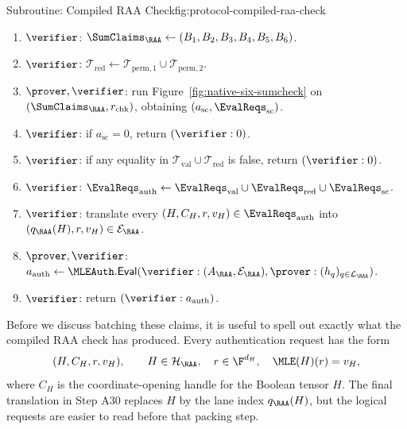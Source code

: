 \begin{protocolbox}{Subroutine: Compiled RAA Check}{fig:protocol-compiled-raa-check}
\begin{enumerate}[leftmargin=0.24in,label=\textbf{A\arabic*.},itemsep=0.06em,topsep=0.06em,parsep=0pt]
  \item \(\verifier\): \(\SumClaims_{\RAA}\gets(B_1,B_2,B_3,B_4,B_5,B_6)\).
  \item \(\verifier\): \(\mathcal T_{\mathrm{red}}\gets
        \mathcal T_{\mathrm{perm},1}\cup\mathcal T_{\mathrm{perm},2}\).
  \item \(\prover,\verifier\): run Figure~\ref{fig:native-six-sumcheck} on
        \((\SumClaims_{\RAA},r_{\mathrm{chk}})\), obtaining
        \((a_{\mathrm{sc}},\EvalReqs_{\mathrm{sc}})\).
  \item \(\verifier\): if \(a_{\mathrm{sc}}=0\), return \((\verifier:0)\).
  \item \(\verifier\): if any equality in
        \(\mathcal T_{\mathrm{val}}\cup\mathcal T_{\mathrm{red}}\) is false,
        return \((\verifier:0)\).
  \item \(\verifier\): \(\EvalReqs_{\mathrm{auth}}\gets
        \EvalReqs_{\mathrm{val}}\cup\EvalReqs_{\mathrm{red}}\cup
        \EvalReqs_{\mathrm{sc}}\).
  \item \(\verifier\): translate every
        \((H,C_H,r,v_H)\in\EvalReqs_{\mathrm{auth}}\) into
        \((q_{\RAA}(H),r,v_H)\in\mathcal E_{\RAA}\).
  \item \(\prover,\verifier\): \(a_{\mathrm{auth}}\gets
        \MLEAuth.\mathsf{Eval}
        (\verifier:(A_{\RAA},\mathcal E_{\RAA}),
        \prover:(h_q)_{q\in\mathcal L_{\RAA}})\).
  \item \(\verifier\): return \((\verifier:a_{\mathrm{auth}})\).
\end{enumerate}
\end{protocolbox}

Before we discuss batching these claims, it is useful to spell out exactly what
the compiled RAA check has produced.  Every authentication request has the form
\[
  (H,C_H,r,v_H),
  \qquad
  H\in\mathcal H_{\RAA},\quad r\in\F^{d_H},\quad
  \MLE(H)(r)=v_H,
\]
where \(C_H\) is the coordinate-opening handle for the Boolean tensor \(H\).
The final translation in Step A30 replaces \(H\) by the lane index
\(q_{\RAA}(H)\), but the logical requests are easier to read before that
packing step.

